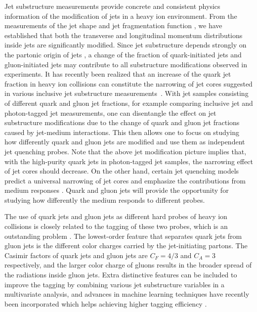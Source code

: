 \documentclass[notoc]{JHEP3}
\begin{document}
Jet substructure measurements provide concrete and consistent physics information of the modification of jets in a heavy ion environment. From the measurements of the jet shape \cite{Ellis:1992qq,Chatrchyan:2013kwa,Khachatryan:2016tfj,Seymour:1997kj,Li:2011hy,Li:2012bw,Vitev:2008rz,Vitev:2009rd} and jet fragmentation function \cite{Procura:2009vm,Chatrchyan:2012gw,Aad:2014wha,Chatrchyan:2014ava,Aaboud:2017bzv,Sirunyan:2018qec}, we have established that both the transverse and longitudinal momentum distributions inside jets are significantly modified. Since jet substructure depends strongly on the partonic origin of jets \cite{Gallicchio:2011xq,Gallicchio:2012ez,Chien:2015ctp,Chien:2014nsa}, a change of the fraction of quark-initiated jets and gluon-initiated jets may contribute to all substructure modifications observed in experiments. It has recently been realized that an increase of the quark jet fraction in heavy ion collisions can constitute the narrowing of jet cores suggested in various inclusive jet substructure measurements~\cite{Chien:2015hda}. With jet samples consisting of different quark and gluon jet fractions, for example comparing inclusive jet and photon-tagged jet measurements, one can disentangle the effect on jet substructure modifications due to the change of quark and gluon jet fractions caused by jet-medium interactions. This then allows one to focus on studying how differently quark and gluon jets are modified and use them as independent jet quenching probes. Note that the above jet modification picture implies that, with the high-purity quark jets in photon-tagged jet samples, the narrowing effect of jet cores should decrease. On the other hand, certain jet quenching models predict a universal narrowing of jet cores \cite{KunnawalkamElayavalli:2017hxo,Milhano:2017nzm,Casalderrey-Solana:2016jvj,Brewer:2017fqy} and emphasize the contributions from medium responses \cite{Tachibana:2017syd}. Quark and gluon jets will provide the opportunity for studying how differently the medium responds to different probes.

The use of quark jets and gluon jets as different hard probes of heavy ion collisions is closely related to the tagging of these two probes, which is an outstanding problem \cite{Gras:2017jty,Frye:2017yrw}. The lowest-order feature that separates quark jets from gluon jets is the different color charges carried by the jet-initiating partons. The Casimir factors of quark jets and gluon jets are $C_F = 4/3$ and $C_A=3$ respectively, and the larger color charge of gluons results in the broader spread of the radiations inside gluon jets. Extra distinctive features can be included to improve the tagging by combining various jet substructure variables in a multivariate analysis, and advances in machine learning techniques have recently been incorporated which helps achieving higher tagging efficiency \cite{Komiske:2016rsd}.
\end{document}
